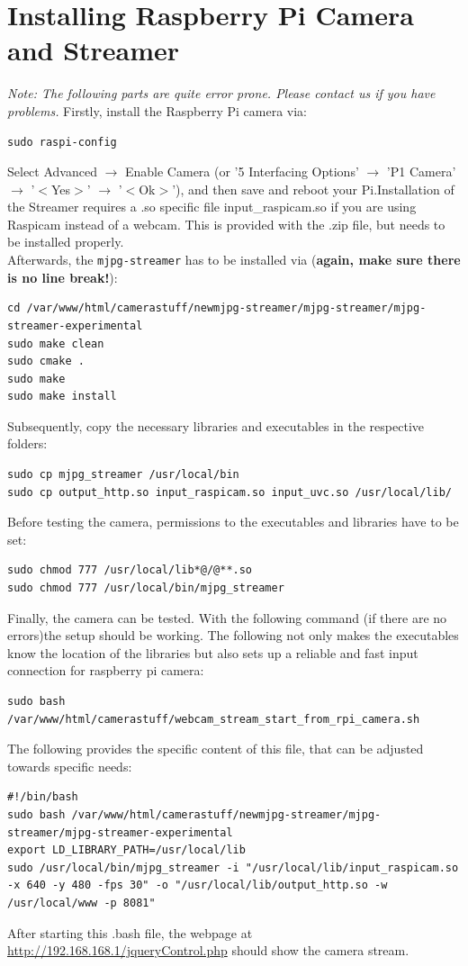 \section{Installing Raspberry Pi Camera and Streamer}
\textit{Note: The following parts are quite error prone. Please contact us if you have problems.}
Firstly, install the Raspberry Pi camera via:
\begin{lstlisting}
sudo raspi-config
\end{lstlisting}
Select Advanced $\rightarrow$ Enable Camera (or '5 Interfacing Options' $\rightarrow$ 'P1 Camera' $\rightarrow$ '$<$Yes$>$' $\rightarrow$ '$<$Ok$>$'), and then save and reboot your Pi.Installation of the Streamer requires a .so specific file input\_raspicam.so if you are using Raspicam instead of a webcam. This is provided with the .zip file, but needs to be installed properly.\\
Afterwards, the \texttt{mjpg-streamer} has to be installed via (\textbf{again, make sure there is no line break!}):
\begin{lstlisting}
cd /var/www/html/camerastuff/newmjpg-streamer/mjpg-streamer/mjpg-streamer-experimental
sudo make clean
sudo cmake .
sudo make
sudo make install
\end{lstlisting}
Subsequently, copy the necessary libraries and executables in the respective folders:
\begin{lstlisting}
sudo cp mjpg_streamer /usr/local/bin
sudo cp output_http.so input_raspicam.so input_uvc.so /usr/local/lib/
\end{lstlisting}
Before testing the camera,  permissions to the executables and libraries have to be set:
\begin{lstlisting}
sudo chmod 777 /usr/local/lib*@/@**.so
sudo chmod 777 /usr/local/bin/mjpg_streamer
\end{lstlisting}
Finally, the camera can be tested. With the following command (if there are no errors)the setup should be working. The following not only makes the executables know the location of the libraries but also sets up a reliable and fast input connection for raspberry pi camera:
\begin{lstlisting}
sudo bash /var/www/html/camerastuff/webcam_stream_start_from_rpi_camera.sh
\end{lstlisting}
The following provides the specific content of this file, that can be adjusted towards specific needs:
\begin{lstlisting}
#!/bin/bash
sudo bash /var/www/html/camerastuff/newmjpg-streamer/mjpg-streamer/mjpg-streamer-experimental 
export LD_LIBRARY_PATH=/usr/local/lib
sudo /usr/local/bin/mjpg_streamer -i "/usr/local/lib/input_raspicam.so -x 640 -y 480 -fps 30" -o "/usr/local/lib/output_http.so -w /usr/local/www -p 8081"
\end{lstlisting}
After starting this .bash file, the webpage at \url{http://192.168.168.1/jqueryControl.php} should show the camera stream.
